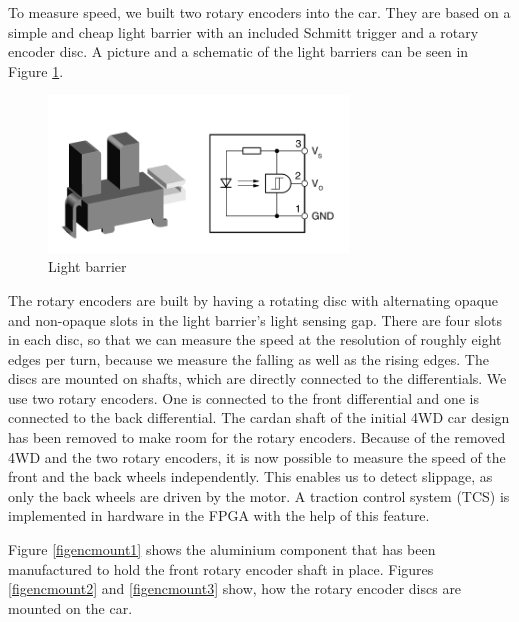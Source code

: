 \documentclass[a4paper
               ,10pt
               ,DIV=10 %
               ,BCOR=0.3cm
               ,pagesize %
               ,headings=small
               ,bibtotoc
               ]
               {scrartcl}
\begin{document}
To measure speed, we built two rotary encoders into the car.
They are based on a simple and cheap light barrier with an included Schmitt trigger and a rotary encoder disc.
A picture and a schematic of the light barriers can be seen in Figure \ref{figls}.
\begin{figure}[H]
\begin{center}
\includegraphics[width=8cm]{pic/ls.png}
\caption{Light barrier}
\label{figls}
\end{center}
\end{figure}


The rotary encoders are built by having a rotating disc with alternating opaque and non-opaque slots in the light barrier's light sensing gap.
There are four slots in each disc, so that we can measure the speed at the resolution of roughly eight edges per turn, because we measure the falling as well as the rising edges.
The discs are mounted on shafts, which are directly connected to the differentials.
We use two rotary encoders.
One is connected to the front differential and one is connected to the back differential.
The cardan shaft of the initial 4WD car design has been removed to make room for the rotary encoders.
Because of the removed 4WD and the two rotary encoders, it is now possible to measure the speed of the front and the back wheels independently.
This enables us to detect slippage, as only the back wheels are driven by the motor.
A traction control system (TCS) is implemented in hardware in the FPGA with the help of this feature.

Figure \ref{figencmount1} shows the aluminium component that has been manufactured to hold the front rotary encoder shaft in place.
Figures \ref{figencmount2} and \ref{figencmount3} show, how the rotary encoder discs are mounted on the car.
\end{document}
